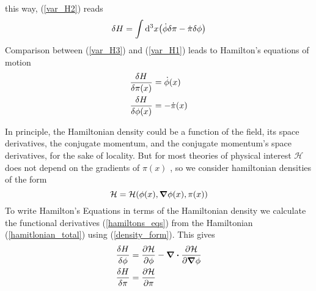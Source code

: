 this way, (\ref{var_H2}) reads
\begin{equation}
    \delta H=\int\dd^3x\qty(\dot{\phi}\delta\pi-\dot{\pi}\delta\phi)
    \label{var_H3}
\end{equation}
Comparison  between (\ref{var_H3}) and (\ref{var_H1}) leads to Hamilton's equations of motion
\begin{equation}\begin{aligned}
    \fdv{H}{\pi(x)}&=\dot{\phi}(x) \\ \fdv{H}{\phi(x)}&=-\dot{\pi}(x)
\end{aligned}
    \label{hamiltons_eqs}
\end{equation}

In principle, the Hamiltonian density could be a function of the field, its space derivatives, the conjugate momentum, and the conjugate momentum's space derivatives, for the sake of locality. But for most theories of physical interest $\mathcal{H}$ does not depend on the gradients of $\pi(x)$ \cite{lemos2018analytical}, so we consider hamiltonian densities of the form
\begin{equation}
    \mathcal{H}=\mathcal{H}(\phi(x),\grad\phi(x),\pi(x))
    \label{density_form}
\end{equation}
To write Hamilton's Equations in terms of the Hamiltonian density we calculate the functional derivatives (\ref{hamiltons_eqs}) from the Hamiltonian (\ref{hamitlonian_total}) using (\ref{density_form}). This gives
\begin{equation}
    \begin{aligned}
        \fdv{H}{\phi}&=\pdv{\mathcal{H}}{\phi}-\div\pdv{\mathcal{H}}{\grad\phi}\\
        \fdv{H}{\pi}&=\pdv{\mathcal{H}}{\pi}
    \end{aligned}
\end{equation}
